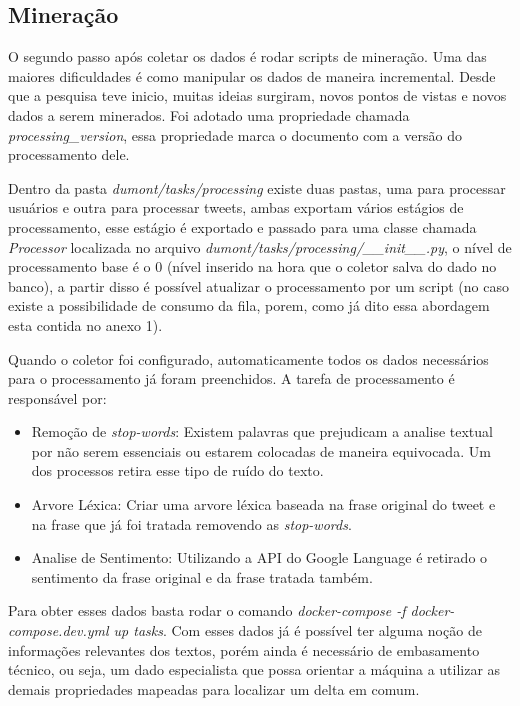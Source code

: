 \subsection{Mineração}
O segundo passo após coletar os dados é rodar scripts de mineração. Uma das maiores dificuldades é como manipular os dados de maneira incremental. Desde que a pesquisa teve inicio, muitas ideias surgiram, novos pontos de vistas e novos dados a serem minerados. Foi adotado uma propriedade chamada \textit{processing_version}, essa propriedade marca o documento com a versão do processamento dele.

Dentro da pasta \textit{dumont/tasks/processing} existe duas pastas, uma para processar usuários e outra para processar tweets, ambas exportam vários estágios de processamento, esse estágio é exportado e passado para uma classe chamada \textit{Processor} localizada no arquivo \textit{dumont/tasks/processing/__init__.py}, o nível de processamento base é o 0 (nível inserido na hora que o coletor salva do dado no banco), a partir disso é possível atualizar o processamento por um script (no caso existe a possibilidade de consumo da fila, porem, como já dito essa abordagem esta contida no anexo 1).

Quando o coletor foi configurado, automaticamente todos os dados necessários para o processamento já foram preenchidos. A tarefa de processamento é responsável por:

\begin{itemize}
    \item Remoção de \textit{stop-words}: Existem palavras que prejudicam a analise textual por não serem essenciais ou estarem colocadas de maneira equivocada. Um dos processos retira esse tipo de ruído do texto.
    \item Arvore Léxica: Criar uma arvore léxica baseada na frase original do tweet e na frase que já foi tratada removendo as \textit{stop-words}.
    \item Analise de Sentimento: Utilizando a API do Google Language é retirado o sentimento da frase original e da frase tratada também.
\end{itemize}

Para obter esses dados basta rodar o comando \textit{docker-compose -f docker-compose.dev.yml up tasks}. Com esses dados já é possível ter alguma noção de informações relevantes dos textos, porém ainda é necessário de embasamento técnico, ou seja, um dado especialista que possa orientar a máquina a utilizar as demais propriedades mapeadas para localizar um delta em comum.

